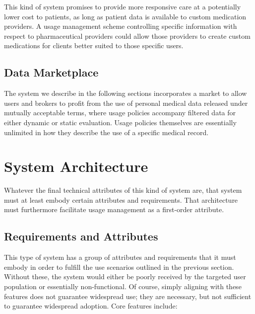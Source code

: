 \documentclass[10pt, conference, compsocconf]{IEEEtran}
\begin{document}
This kind of system promises to provide more responsive care at a potentially lower cost to patients, as long as patient data is available to custom medication providers.  A usage management scheme controlling specific information with respect to pharmaceutical providers could allow those providers to create custom medications for clients  better suited to those specific users.

\subsection{Data Marketplace}
The system we describe in the following sections incorporates a market to allow users and brokers to profit from the use of personal medical data released under mutually acceptable terms, where usage policies accompany filtered data for either dynamic or static evaluation.  Usage policies themselves are essentially unlimited in how they describe the use of a specific medical record.

\section{System Architecture}
Whatever the final technical attributes of this kind of system are, that system must at least embody certain attributes and requirements.  That architecture must furthermore facilitate usage management as a first-order attribute.

\subsection{Requirements and Attributes}
This type of system has a group of attributes and requirements that it must embody in order to fulfill the use scenarios outlined in the previous section.  Without these, the system would either be poorly received by the targeted user population or essentially non-functional.  Of course, simply aligning with these features does not guarantee widespread use; they are necessary, but not sufficient to guarantee widespread adoption.  Core features include:
\end{document}
